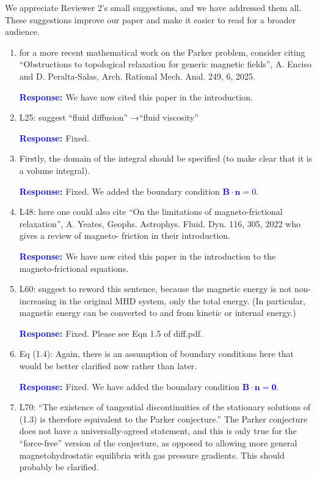 \documentclass{article}
\theoremstyle{definition}
\newcommand{\rv}[1]{%
  \colorbox{gray!20}{%
    \parbox{0.96\linewidth}{%
      \small #1
    }%
  }%
}
\newcommand{\rp}{\textbf{\textcolor{blue}{Response: }}}
\newcommand{\blue}[1]{\textcolor{blue}{#1}}
\begin{document}
We appreciate Reviewer 2's small suggestions, and we have addressed them all. These suggestions improve our paper and make it easier to read for a broader audience.

\begin{enumerate}
    \item \rv{for a more recent mathematical work on the Parker problem, consider citing “Obstructions to topological relaxation for generic magnetic fields”, A. Enciso and D. Peralta-Salas,
Arch. Rational Mech. Anal. 249, 6, 2025.}

\rp We have now cited this paper in the introduction.

\item \rv{L25: suggest “fluid diﬀusion” →“fluid viscosity”}

\rp Fixed. 

\item \rv{Firstly, the domain of the integral should be specified (to make clear that it is a
volume integral).}

\rp Fixed. We added the boundary condition \blue{$\bm B\cdot \bm n=0$.} 

\item \rv{L48: here one could also cite “On the limitations of magneto-frictional relaxation”, A.
Yeates, Geophs. Astrophys. Fluid. Dyn. 116, 305, 2022 who gives a review of magneto-
friction in their introduction.}

\rp We have now cited this paper in the introduction to the magneto-frictional equations.

\item \rv{L60: suggest to reword this sentence, because the magnetic energy is not non-increasing
in the original MHD system, only the total energy. (In particular, magnetic energy can be
converted to and from kinetic or internal energy.)}

\rp Fixed. Please see Eqn 1.5 of diff.pdf. 

\item \rv{Eq (1.4): Again, there is an assumption of boundary conditions here that would be better
clarified now rather than later.}

\rp Fixed. We have added the boundary condition \blue{$\bm B\cdot \bm n = \bm 0$}. 

\item \rv{L70: “The existence of tangential discontinuities of the stationary solutions of (1.3) is
therefore equivalent to the Parker conjecture.” The Parker conjecture does not have
a universally-agreed statement, and this is only true for the “force-free” version of the
conjecture, as opposed to allowing more general magnetohydrostatic equilibria with gas
pressure gradients. This should probably be clarified.}


\end{enumerate}
\end{document}
